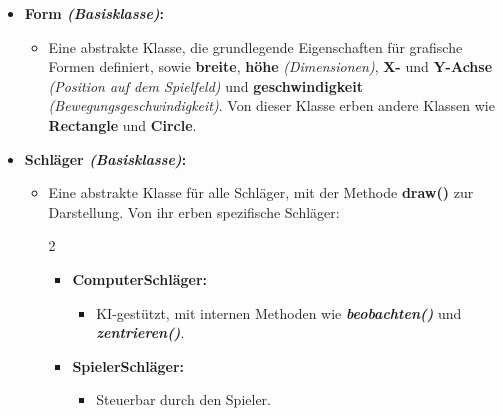 \documentclass[a4paper,12pt]{article}
\begin{document}
\begin{itemize}[label={},leftmargin=*,noitemsep,topsep=0pt,parsep=0pt]
    \item \textbf{Form  \textit{(Basisklasse)}:} 
    \begin{itemize}[label={},leftmargin=*,noitemsep,topsep=0pt,parsep=0pt]
        \item Eine abstrakte Klasse, die grundlegende Eigenschaften für grafische Formen definiert, sowie \textbf{breite}, \textbf{höhe}  \textit{(Dimensionen)}, \textbf{X-} und \textbf{Y-Achse}  \textit{(Position auf dem Spielfeld)} und \textbf{geschwindigkeit}  \textit{(Bewegungsgeschwindigkeit)}. Von dieser Klasse erben andere Klassen wie \textbf{Rectangle} und \textbf{Circle}.
    \end{itemize}
    \vspace{0.5\baselineskip}
    \item \textbf{Schläger \textit{(Basisklasse)}:}
    \begin{itemize}[label={},leftmargin=*,noitemsep,topsep=0pt,parsep=0pt]
        \item Eine abstrakte Klasse für alle Schläger, mit der Methode \textbf{draw()} zur Darstellung. Von ihr erben spezifische Schläger:
        \vspace{-0.9\baselineskip}
        \begin{multicols}{2}
        \begin{itemize}[label={},leftmargin=*,noitemsep,topsep=0pt,parsep=0pt]
            \item \textbf{ComputerSchläger:}
            \begin{itemize}[label={},leftmargin=*,noitemsep,topsep=0pt,parsep=0pt]
                \item KI-gestützt, mit internen Methoden wie \textit{\textbf{beobachten()}} und \textit{\textbf{zentrieren()}}.
            \end{itemize}
        \end{itemize}
        \columnbreak
        \begin{itemize}[label={},leftmargin=*,noitemsep,topsep=0pt,parsep=0pt]
            \item \textbf{SpielerSchläger:}
            \begin{itemize}[label={},leftmargin=*,noitemsep,topsep=0pt,parsep=0pt]
                \item Steuerbar durch den Spieler.
            \end{itemize}
        \end{itemize}
        \end{multicols}

\end{itemize}
\end{itemize}
\end{document}
